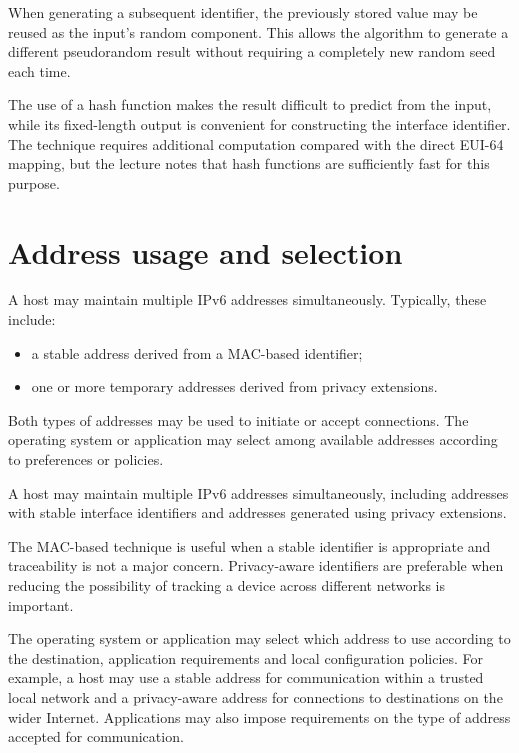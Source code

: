 \begin{center}
\end{center}

When generating a subsequent identifier, the previously stored value
may be reused as the input's random component. This allows the
algorithm to generate a different pseudorandom result without
requiring a completely new random seed each time.

The use of a hash function makes the result difficult to predict
from the input, while its fixed-length output is convenient for
constructing the interface identifier. The technique requires
additional computation compared with the direct EUI-64 mapping,
but the lecture notes that hash functions are sufficiently fast for
this purpose.


\section{Address usage and selection}

A host may maintain multiple IPv6 addresses simultaneously. Typically, these include:

\begin{itemize}
\item a stable address derived from a MAC-based identifier;
\item one or more temporary addresses derived from privacy extensions.
\end{itemize}

Both types of addresses may be used to initiate or accept connections. The operating system or application may select among available addresses according to preferences or policies.


A host may maintain multiple IPv6 addresses simultaneously, including
addresses with stable interface identifiers and addresses generated
using privacy extensions.

The MAC-based technique is useful when a stable identifier is
appropriate and traceability is not a major concern. Privacy-aware
identifiers are preferable when reducing the possibility of tracking
a device across different networks is important.

The operating system or application may select which address to use
according to the destination, application requirements and local
configuration policies. For example, a host may use a stable address
for communication within a trusted local network and a privacy-aware
address for connections to destinations on the wider Internet.
Applications may also impose requirements on the type of address
accepted for communication.




